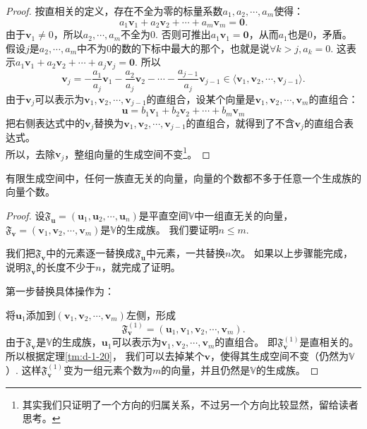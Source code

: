 \documentclass[12pt,UTF8,fontset=none]{ctexbook}
\begin{document}
\begin{appendix}
\begin{proof}
    按直相关的定义，存在不全为零的标量系数$a_1, a_2, \cdots, a_m$使得：
    $$ a_1\mathbf{v}_1+a_2\mathbf{v}_2+\cdots+a_m\mathbf{v}_m = \mathbf{0}. $$
    由于$\mathbf{v}_1 \neq 0$，所以$a_2, \cdots, a_m$不全为0. 否则可推出$a_1\mathbf{v}_1 = \mathbf{0}$，从而$a_1$也是0，矛盾。\\
    假设$j$是$a_2, \cdots, a_m$中不为0的数的下标中最大的那个，也就是说$\forall k > j, a_k = 0$. 这表示$ a_1\mathbf{v}_1+a_2\mathbf{v}_2+\cdots+a_j\mathbf{v}_j = \mathbf{0}. $
    所以
    $$ \mathbf{v}_j = -\frac{a_1}{a_j}\mathbf{v}_1-\frac{a_2}{a_j}\mathbf{v}_2-\cdots-\frac{a_{j-1}}{a_j}\mathbf{v}_{j-1} \in \langle \mathbf{v}_1, \mathbf{v}_2 , \cdots , \mathbf{v}_{j-1}\rangle. $$
    由于$ \mathbf{v}_j$可以表示为$\mathbf{v}_1, \mathbf{v}_2 , \cdots , \mathbf{v}_{j-1}$的直组合，设某个向量是$\mathbf{v}_1, \mathbf{v}_2 , \cdots , \mathbf{v}_m$的直组合：
    $$ \mathbf{u} = b_1\mathbf{v}_1+b_2\mathbf{v}_2+\cdots+b_m\mathbf{v}_m$$
    把右侧表达式中的$\mathbf{v}_j$替换为$\mathbf{v}_1, \mathbf{v}_2 , \cdots , \mathbf{v}_{j-1}$的直组合，就得到了不含$\mathbf{v}_j$的直组合表达式。\\
    所以，去除$\mathbf{v}_j$，整组向量的生成空间不变\footnote{其实我们只证明了一个方向的归属关系，不过另一个方向比较显然，留给读者思考。}。
\end{proof}

\begin{tm}\label{tm:d-1-30}
    有限生成空间中，任何一族直无关的向量，向量的个数都不多于任意一个生成族的向量个数。
\end{tm}

\begin{proof}
    
    设$\mathfrak{F}_{\mathbf{u}} = (\mathbf{u}_1, \mathbf{u}_2, \cdots , \mathbf{u}_n )$是平直空间$\mathbb{V}$中一组直无关的向量，
    $\mathfrak{F}_{\mathbf{v}} = (\mathbf{v}_1, \mathbf{v}_2, \cdots , \mathbf{v}_m )$是$\mathbb{V}$的生成族。
    我们要证明$n \leq m$. 

    我们把$\mathfrak{F}_{\mathbf{v}}$中的元素逐一替换成$\mathfrak{F}_{\mathbf{u}}$中元素，一共替换$n$次。
    如果以上步骤能完成，说明$\mathfrak{F}_{\mathbf{v}}$的长度不少于$n$，就完成了证明。

    第一步替换具体操作为：

    将$\mathbf{u}_1$添加到$(\mathbf{v}_1, \mathbf{v}_2, \cdots , \mathbf{v}_m )$左侧，形成
    $$\mathfrak{F}_{\mathbf{v}}^{(1)} = (\mathbf{u}_1, \mathbf{v}_1, \mathbf{v}_2, \cdots , \mathbf{v}_m ).$$
    由于$\mathfrak{F}_{\mathbf{v}}$是$\mathbb{V}$的生成族，$\mathbf{u}_1$可以表示为$\mathbf{v}_1, \mathbf{v}_2, \cdots , \mathbf{v}_m$的直组合。
    即$\mathfrak{F}_{\mathbf{v}}^{(1)}$是直相关的。所以根据定理\ref{tm:d-1-20}，
    我们可以去掉某个$\mathbf{v}$，使得其生成空间不变（仍然为$\mathbb{V}$）.
    这样$\mathfrak{F}_{\mathbf{v}}^{(1)}$变为一组元素个数为$m$的向量，并且仍然是$\mathbb{V}$的生成族。
    

\end{proof}
\end{appendix}
\end{document}
